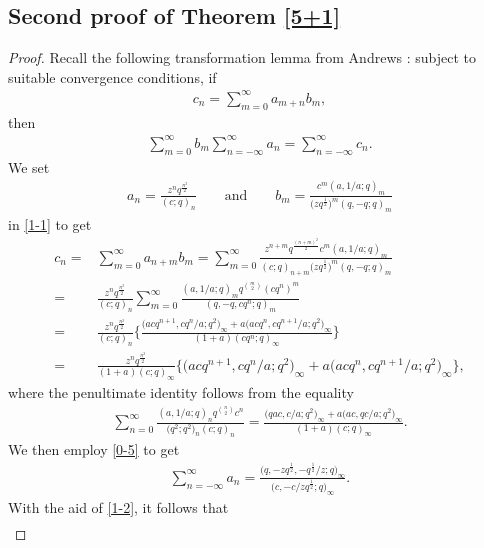 \documentclass[pdftex]{sigma}
\numberwithin{equation}{section}
\begin{document}
\subsection[Second proof of Theorem 2.6]{Second proof of Theorem \ref{5+1}} \label{sec3}
\begin{proof}
 Recall the following transformation lemma from Andrews \cite{A}: subject to suitable convergence conditions, if
\begin{align}\label{1-1}
c_{n}=\sum_{m=0}^{\infty}a_{m+n}b_{m},
\end{align}
then
\begin{align}\label{1-2}
\sum_{m=0}^{\infty}b_{m}\sum_{n=-\infty}^{\infty}a_{n}
=\sum_{n=-\infty}^{\infty}c_{n}.
\end{align}
We set
\begin{align*}
a_n=\frac{z^nq^{\frac{n^2}{2}}}{(c;q)_n} \qquad \text{and} \qquad
b_m=\frac{c^m(a,1/a;q)_m}{\bigl(zq^{\frac{1}{2}}\bigr)^m(q,-q;q)_m}
\end{align*}
in \eqref{1-1} to get
\begin{align*}
c_n={}&\sum_{m=0}^{\infty}a_{n+m}b_m
=\sum_{m=0}^{\infty}\frac{z^{n+m}q^{\frac{(n+m)^2}{2}}c^m(a,1/a;q)_m}
{(c;q)_{n+m}\bigl(zq^{\frac{1}{2}}\bigr)^m(q,-q;q)_m}\\
={}&\frac{z^nq^{\frac{n^2}{2}}}{(c;q)_n}\sum_{m=0}^{\infty}
\frac{(a,1/a;q)_mq^{m\choose2}(cq^n)^m}
{(q,-q,cq^n;q)_m}\\
={}&\frac{z^nq^{\frac{n^2}{2}}}{(c;q)_n}
\bigg\{\frac{\bigl(acq^{n+1},cq^n/a;q^2\bigr)_{\infty}
+a\bigl(acq^n,cq^{n+1}/a;q^2\bigr)_{\infty}}{(1+a)(cq^n;q)_{\infty}}\bigg\}\\
={}&\frac{z^nq^{\frac{n^2}{2}}}{(1+a)(c;q)_{\infty}}
\big\{\bigl(acq^{n+1},cq^n/a;q^2\bigr)_{\infty}
+a\bigl(acq^n,cq^{n+1}/a;q^2\bigr)_{\infty}\big\},
\end{align*}
where the penultimate identity follows from the equality \cite[Example~8]{ZS2}
\begin{align*}
\sum_{n=0}^{\infty}\frac{(a,1/a;q)_nq^{n\choose2}c^n}{\bigl(q^2;q^2\bigr)_n(c;q)_n}
=\frac{\bigl(qac,c/a;q^2\bigr)_{\infty}+a\bigl(ac,qc/a;q^2\bigr)_{\infty}}{(1+a)(c;q)_{\infty}}.
\end{align*}
We then employ \eqref{0-5} to get
\begin{align*}
\sum_{n=-\infty}^{\infty}a_n=\frac{\bigl(q,-zq^{\frac{1}{2}},-q^{\frac{1}{2}}/z;q\bigr)_{\infty}}
{\bigl(c,-c/zq^{\frac{1}{2}};q\bigr)_{\infty}}.
\end{align*}
With the aid of \eqref{1-2}, it follows that
\begin{gather*}

\end{gather*}
\end{proof}
\end{document}
